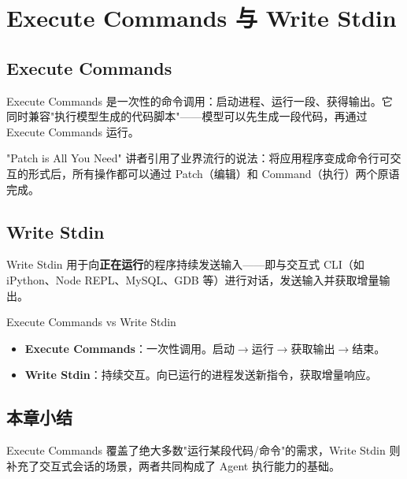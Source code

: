 \section{Execute Commands 与 Write Stdin}

\subsection{Execute Commands}

Execute Commands 是一次性的命令调用：启动进程、运行一段、获得输出。它同时兼容"执行模型生成的代码脚本"——模型可以先生成一段代码，再通过 Execute Commands 运行。

\begin{knowledgebox}{"Patch is All You Need"}
讲者引用了业界流行的说法：将应用程序变成命令行可交互的形式后，所有操作都可以通过 Patch（编辑）和 Command（执行）两个原语完成。
\end{knowledgebox}

\subsection{Write Stdin}

Write Stdin 用于向\textbf{正在运行}的程序持续发送输入——即与交互式 CLI（如 iPython、Node REPL、MySQL、GDB 等）进行对话，发送输入并获取增量输出。

\begin{importantbox}{Execute Commands vs Write Stdin}
\begin{itemize}
    \item \textbf{Execute Commands}：一次性调用。启动$\rightarrow$运行$\rightarrow$获取输出$\rightarrow$结束。
    \item \textbf{Write Stdin}：持续交互。向已运行的进程发送新指令，获取增量响应。
\end{itemize}
\end{importantbox}

\subsection{本章小结}

Execute Commands 覆盖了绝大多数"运行某段代码/命令"的需求，Write Stdin 则补充了交互式会话的场景，两者共同构成了 Agent 执行能力的基础。


